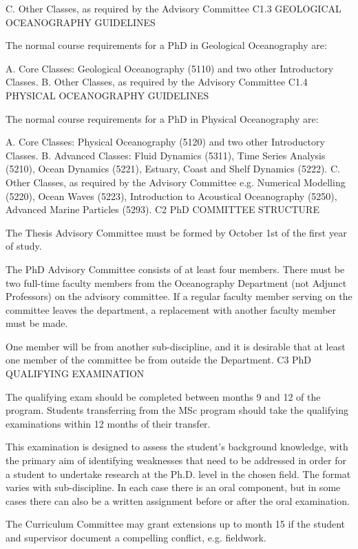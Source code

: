 C.	Other Classes, as required by the Advisory Committee
C1.3	GEOLOGICAL OCEANOGRAPHY GUIDELINES

The normal course requirements for a PhD in Geological Oceanography are:

A.	Core Classes: Geological Oceanography (5110) and two other Introductory Classes.
B.	Other Classes, as required by the Advisory Committee
C1.4	PHYSICAL OCEANOGRAPHY GUIDELINES

The normal course requirements for a PhD in Physical Oceanography are:

A.	Core Classes: Physical Oceanography (5120) and two other Introductory Classes.
B.	Advanced Classes: Fluid Dynamics (5311), Time Series Analysis (5210), Ocean Dynamics (5221), Estuary, Coast and Shelf Dynamics (5222).
C.	Other Classes, as required by the Advisory Committee e.g. Numerical Modelling (5220), Ocean Waves (5223), Introduction to Acoustical Oceanography (5250), Advanced Marine Particles (5293).
C2	PhD COMMITTEE STRUCTURE

The Thesis Advisory Committee must be formed by October 1st of the first year of study.

The PhD Advisory Committee consists of at least four members. There must be two full-time faculty members from the Oceanography Department (not Adjunct Professors) on the advisory committee. If a regular faculty member serving on the committee leaves the department, a replacement with another faculty member must be made.

One member will be from another sub-discipline, and it is desirable that at least one member of the committee be from outside the Department.
C3	PhD QUALIFYING EXAMINATION

The qualifying exam should be completed between months 9 and 12 of the program.
Students transferring from the MSc program should take the qualifying examinations within 12 months of their transfer.

This examination is designed to assess the student's background knowledge, with the primary aim of identifying weaknesses that need to be addressed in order for a student to undertake research at the Ph.D. level in the chosen field. The format varies with sub-discipline. In each case there is an oral component, but in some cases there can also be a written assignment before or after the oral examination.

The Curriculum Committee may grant extensions up to month 15 if the student and supervisor document a compelling conflict, e.g. fieldwork.
 

